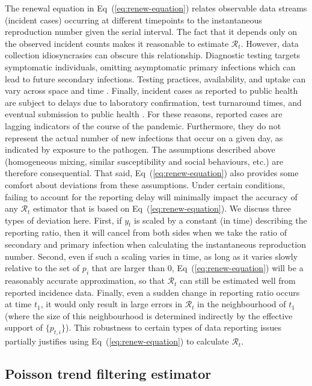 \documentclass[10pt,letterpaper]{article}
\def\calR{\mathcal{R}}
\renewcommand{\eqref}[1]{Eq~(\ref{#1})}
\begin{document}
The renewal equation in \eqref{eq:renew-equation} relates observable data
streams (incident cases) occurring at different timepoints to the instantaneous reproduction
number given the serial interval. The fact that it depends only on the observed
incident counts makes it reasonable to estimate $\calR_t$. However, 
data collection idiosyncrasies can obscure this relationship. Diagnostic testing
targets symptomatic individuals, omitting asymptomatic primary infections which
can lead to future secondary infections. Testing practices, availability, and
uptake can vary across space and time \cite{pitzer2021impact,
hitchings2021usefulness}. Finally, incident cases as reported to public health
are subject to delays due to laboratory confirmation, test turnaround times, and
eventual submission to public health \cite{pellis2021challenges}. For these
reasons, reported cases are lagging indicators of the course of the pandemic.
Furthermore, they do not represent the actual number of new infections that
occur on a given day, as indicated by exposure to the pathogen. The assumptions
described above (homogeneous mixing,
similar susceptibility and social behaviours, etc.) are therefore consequential.
That said, \eqref{eq:renew-equation} also provides some comfort about deviations
from these assumptions. Under certain conditions, failing to account for the 
reporting delay will minimally impact the accuracy of any $\mathcal{R}_t$ estimator 
that is based on \eqref{eq:renew-equation}. We discuss three types of deviation here.
First, if $y_t$ is scaled by a constant (in time) describing
the reporting ratio, then it will cancel from both sides when we take the ratio
of secondary and primary infection when calculating the instantaneous reproduction 
number. Second, even if such a scaling varies in time, as long as it varies slowly relative
to the set of $p_i$ that are larger than 0, \eqref{eq:renew-equation} will be a
reasonably accurate approximation, so that $\calR_t$ can still be estimated well
from reported incidence data. Finally, even a sudden change in reporting ratio
occurs at time $t_1$, it would only result in 
large errors in $\calR_t$ in the neighbourhood of $t_1$ (where the size of this 
neighbourhood is determined indirectly by the effective support of $\{p_{t,i}\}$). 
This robustness to certain types of data reporting issues partially justifies 
using \eqref{eq:renew-equation} to calculate $\calR_t$.


\subsection{Poisson trend filtering estimator} 
\end{document}
